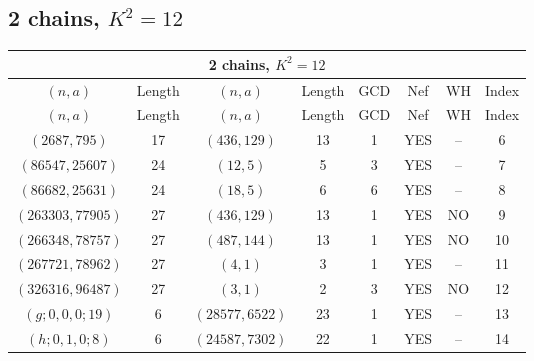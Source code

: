 \subsection{2 chains, \(K^2 = 12\)}
\begin{longtable}{|c|c|c|c|c|c|c|c|}
\hline
\multicolumn{8}{|c|}{2 chains, $K^2 = 12$}\\
\hline
$(n,a)$ & Length & $(n,a)$ & Length & GCD & Nef & WH & Index\\
\hline
\endfirsthead

\hline
$(n,a)$ & Length & $(n,a)$ & Length & GCD & Nef & WH & Index\\
\hline
\endhead
\hline
\endfoot

$(2687, 795)$ & 17 & $(436, 129)$ & 13 & 1 & YES & -- & 6\\
$(86547, 25607)$ & 24 & $(12, 5)$ & 5 & 3 & YES & -- & 7\\
$(86682, 25631)$ & 24 & $(18, 5)$ & 6 & 6 & YES & -- & 8\\
$(263303, 77905)$ & 27 & $(436, 129)$ & 13 & 1 & YES & NO & 9\\
$(266348, 78757)$ & 27 & $(487, 144)$ & 13 & 1 & YES & NO & 10\\
$(267721, 78962)$ & 27 & $(4, 1)$ & 3 & 1 & YES & -- & 11\\
$(326316, 96487)$ & 27 & $(3, 1)$ & 2 & 3 & YES & NO & 12\\
$(g; 0, 0, 0; 19)$ & 6 & $(28577, 6522)$ & 23 & 1 & YES & -- & 13\\
$(h; 0, 1, 0; 8)$ & 6 & $(24587, 7302)$ & 22 & 1 & YES & -- & 14
\end{longtable}
